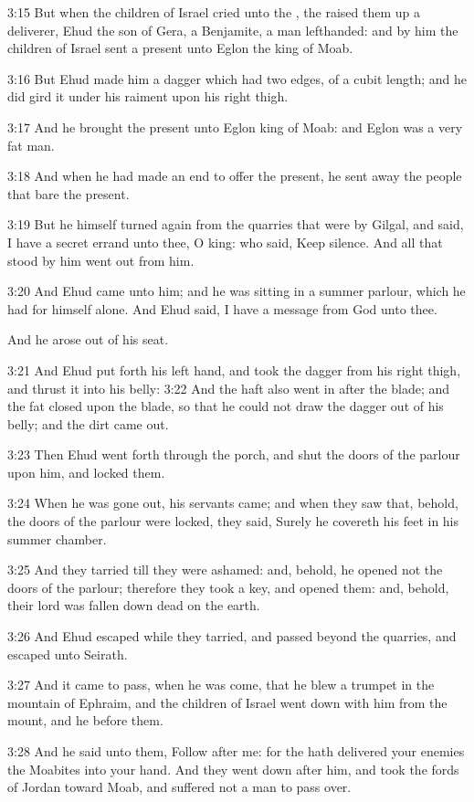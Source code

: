 3:15 But when the children of Israel cried unto the \LORD, the \LORD raised them up a deliverer, Ehud the son of Gera, a Benjamite, a man lefthanded: and by him the children of Israel sent a present unto Eglon the king of Moab.

3:16 But Ehud made him a dagger which had two edges, of a cubit length; and he did gird it under his raiment upon his right thigh.

3:17 And he brought the present unto Eglon king of Moab: and Eglon was a very fat man.

3:18 And when he had made an end to offer the present, he sent away the people that bare the present.

3:19 But he himself turned again from the quarries that were by Gilgal, and said, I have a secret errand unto thee, O king: who said, Keep silence. And all that stood by him went out from him.

3:20 And Ehud came unto him; and he was sitting in a summer parlour, which he had for himself alone. And Ehud said, I have a message from God unto thee.

And he arose out of his seat.

3:21 And Ehud put forth his left hand, and took the dagger from his right thigh, and thrust it into his belly: 3:22 And the haft also went in after the blade; and the fat closed upon the blade, so that he could not draw the dagger out of his belly; and the dirt came out.

3:23 Then Ehud went forth through the porch, and shut the doors of the parlour upon him, and locked them.

3:24 When he was gone out, his servants came; and when they saw that, behold, the doors of the parlour were locked, they said, Surely he covereth his feet in his summer chamber.

3:25 And they tarried till they were ashamed: and, behold, he opened not the doors of the parlour; therefore they took a key, and opened them: and, behold, their lord was fallen down dead on the earth.

3:26 And Ehud escaped while they tarried, and passed beyond the quarries, and escaped unto Seirath.

3:27 And it came to pass, when he was come, that he blew a trumpet in the mountain of Ephraim, and the children of Israel went down with him from the mount, and he before them.

3:28 And he said unto them, Follow after me: for the \LORD hath delivered your enemies the Moabites into your hand. And they went down after him, and took the fords of Jordan toward Moab, and suffered not a man to pass over.

